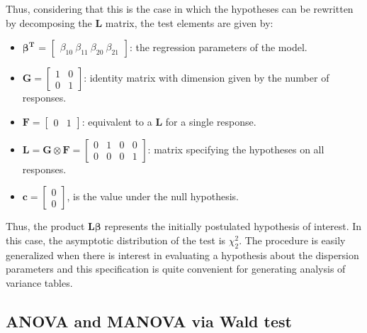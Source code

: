 \documentclass[AMA,STIX1COL]{WileyNJD-v2}
\begin{document}
Thus, considering that this is the case in which the hypotheses can be rewritten by decomposing the $\boldsymbol{L}$ matrix, the test elements are given by:

\begin{itemize}
  
  \item $\boldsymbol{\beta^{T}}$ = $\begin{bmatrix} \beta_{10} \  \beta_{11} \  \beta_{20} \  \beta_{21} \end{bmatrix}$: the regression parameters of the model.


\item $\boldsymbol{G} = \begin{bmatrix} 1 & 0 \\ 0 & 1  \end{bmatrix}$: identity matrix with dimension given by the number of responses.

\item $\boldsymbol{F} = \begin{bmatrix} 0 & 1 \end{bmatrix}$: equivalent to a $\boldsymbol{L}$ for a single response.

\item $\boldsymbol{L} = \boldsymbol{G} \otimes \boldsymbol{F} =  \begin{bmatrix} 0 & 1 & 0 & 0 \\
0 & 0 & 0 & 1 \end{bmatrix}$: matrix specifying the hypotheses on all responses.
 
\item $\boldsymbol{c} = \begin{bmatrix} 0 \\ 0 \end{bmatrix}$, is the value under the null hypothesis.

\end{itemize}

Thus, the product $\boldsymbol{L}\boldsymbol{\beta}$ represents the initially postulated hypothesis of interest. In this case, the asymptotic distribution of the test is $\chi^2_2$. The procedure is easily generalized when there is interest in evaluating a hypothesis about the dispersion parameters and this specification is quite convenient for generating analysis of variance tables.

\subsection{ANOVA and MANOVA via Wald test}
\end{document}
